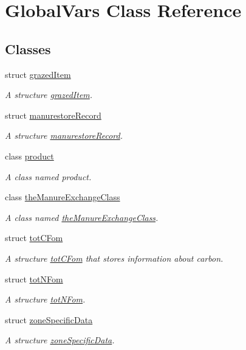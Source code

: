 \hypertarget{class_global_vars}{}\section{Global\+Vars Class Reference}
\label{class_global_vars}
\subsection*{Classes}
\begin{DoxyCompactItemize}
\item 
struct \mbox{\hyperlink{struct_global_vars_1_1grazed_item}{grazed\+Item}}
\begin{DoxyCompactList}\small\item\em A structure \mbox{\hyperlink{struct_global_vars_1_1grazed_item}{grazed\+Item}}. \end{DoxyCompactList}\item 
struct \mbox{\hyperlink{struct_global_vars_1_1manurestore_record}{manurestore\+Record}}
\begin{DoxyCompactList}\small\item\em A structure \mbox{\hyperlink{struct_global_vars_1_1manurestore_record}{manurestore\+Record}}. \end{DoxyCompactList}\item 
class \mbox{\hyperlink{class_global_vars_1_1product}{product}}
\begin{DoxyCompactList}\small\item\em A class named product. \end{DoxyCompactList}\item 
class \mbox{\hyperlink{class_global_vars_1_1the_manure_exchange_class}{the\+Manure\+Exchange\+Class}}
\begin{DoxyCompactList}\small\item\em A class named \mbox{\hyperlink{class_global_vars_1_1the_manure_exchange_class}{the\+Manure\+Exchange\+Class}}. \end{DoxyCompactList}\item 
struct \mbox{\hyperlink{struct_global_vars_1_1tot_c_fom}{tot\+C\+Fom}}
\begin{DoxyCompactList}\small\item\em A structure \mbox{\hyperlink{struct_global_vars_1_1tot_c_fom}{tot\+C\+Fom}} that stores information about carbon. \end{DoxyCompactList}\item 
struct \mbox{\hyperlink{struct_global_vars_1_1tot_n_fom}{tot\+N\+Fom}}
\begin{DoxyCompactList}\small\item\em A structure \mbox{\hyperlink{struct_global_vars_1_1tot_n_fom}{tot\+N\+Fom}}. \end{DoxyCompactList}\item 
struct \mbox{\hyperlink{struct_global_vars_1_1zone_specific_data}{zone\+Specific\+Data}}
\begin{DoxyCompactList}\small\item\em A structure \mbox{\hyperlink{struct_global_vars_1_1zone_specific_data}{zone\+Specific\+Data}}. \end{DoxyCompactList}\end{DoxyCompactItemize}
